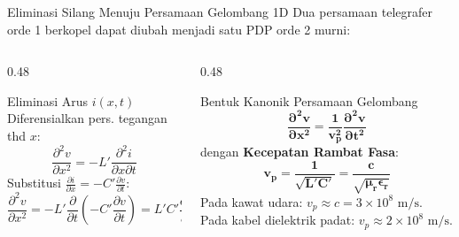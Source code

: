 \documentclass[aspectratio=169,10pt]{beamer}
\begin{document}
\begin{frame}{Eliminasi Silang Menuju Persamaan Gelombang 1D}
  Dua persamaan telegrafer orde 1 berkopel dapat diubah menjadi satu PDP orde 2 murni:
  \begin{columns}[t]
    \begin{column}{0.48\textwidth}
      \begin{block}{Eliminasi Arus $i(x, t)$}
        \small
        Diferensialkan pers. tegangan thd $x$:
        \begin{equation*}
          \frac{\partial^2 v}{\partial x^2} = -L' \frac{\partial^2 i}{\partial x \partial t}
        \end{equation*}
        Substitusi $\frac{\partial i}{\partial x} = -C' \frac{\partial v}{\partial t}$:
        \begin{equation*}
          \frac{\partial^2 v}{\partial x^2} = -L' \frac{\partial}{\partial t}\left(-C'\frac{\partial v}{\partial t}\right) = L'C' \frac{\partial^2 v}{\partial t^2}
        \end{equation*}
      \end{block}
    \end{column}
    \begin{column}{0.48\textwidth}
      \begin{alertblock}{Bentuk Kanonik Persamaan Gelombang}
        \small
        \begin{equation*}
          \mathbf{\frac{\partial^2 v}{\partial x^2} = \frac{1}{v_p^2} \frac{\partial^2 v}{\partial t^2}}
        \end{equation*}
        dengan \textbf{Kecepatan Rambat Fasa}:
        \begin{equation*}
          \mathbf{v_p = \frac{1}{\sqrt{L'C'}} = \frac{c}{\sqrt{\mu_r \epsilon_r}}}
        \end{equation*}
        Pada kawat udara: $v_p \approx c = 3 \times 10^8\text{ m/s}$. Pada kabel dielektrik padat: $v_p \approx 2 \times 10^8\text{ m/s}$.
      \end{alertblock}
    \end{column}
  \end{columns}
\end{frame}
\end{document}
